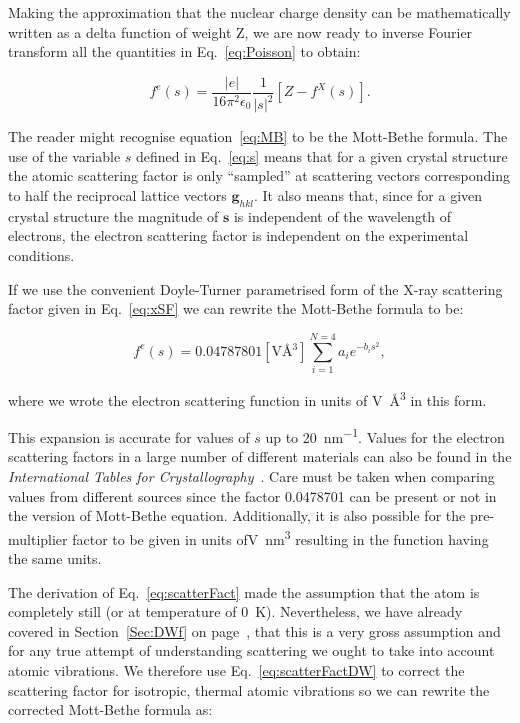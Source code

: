Making the approximation that the nuclear charge density can be mathematically written as a delta function of weight Z, we are now ready to inverse Fourier transform all the quantities in Eq.~\ref{eq:Poisson} to obtain:

\begin{equation}
f^e(s)  = \frac{|e|}{16 \pi^2 \epsilon_0 } \frac{1}{|s|^2} \left[Z-f^X(s) \right].
\label{eq:MB}
\end{equation}

The reader might recognise equation~\ref{eq:MB} to be the Mott-Bethe formula. The use of the variable $s$ defined in Eq.~\ref{eq:s} means that for a given crystal structure the atomic scattering factor is only ``sampled'' at scattering vectors corresponding to half the reciprocal lattice vectors $\mathbf{g}_{hkl}$. It also means that, since for a given crystal structure the magnitude of $\mathbf{s}$ is independent of the wavelength of electrons, the electron scattering factor is independent on the experimental conditions. 

If we use the convenient Doyle-Turner parametrised form of the X-ray scattering factor given in Eq.~\ref{eq:xSF} we can rewrite the Mott-Bethe formula to be:

\begin{equation}
\label{eq:scatterFact}
f^e(s) = 0.04787801[\si{\volt \angstrom^3}]\sum_{i=1}^{N=4}a_ie^{-b_is^2},
\end{equation}

where we wrote the electron scattering function  in units of \si{\volt \angstrom^3} in this form.

This expansion is accurate for values of $s$ up to 20~\si{\nano\meter^{-1}}. Values for the electron scattering factors in a large number of different materials can also be found in the \textit{International Tables for Crystallography}~\cite{IntTableCrysC}. Care must be taken when comparing values from different sources since the factor 0.0478701 can be present or not in the version of Mott-Bethe equation. Additionally, it is also possible for the pre-multiplier factor to be given in units of\si{\volt \nano\meter^3} resulting in the function having the same units. 

The derivation of Eq.~\ref{eq:scatterFact} made the assumption that the atom is completely still (or at temperature of \SI{0}{K}). Nevertheless, we have already covered in Section~\ref{Sec:DWf} on page~\pageref{Sec:DWf}, that this is a very gross assumption and for any true attempt of understanding scattering we ought to take into account atomic vibrations. We therefore use Eq.~\ref{eq:scatterFactDW} to correct the scattering factor for isotropic, thermal atomic vibrations so we can rewrite the corrected Mott-Bethe formula as:

